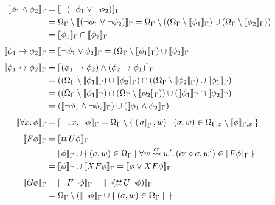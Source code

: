 \begin{align}
  \llbracket \phi_1 \land \phi_2 \rrbracket_{\Gamma}
    &= \llbracket \neg(\neg\phi_1 \lor \neg\phi_2) \rrbracket_{\Gamma} \notag \\
    &= \Omega_{\Gamma} \setminus \llbracket (\neg\phi_1 \lor \neg\phi_2) \rrbracket_{\Gamma} \notag
     = \Omega_{\Gamma} \setminus ((\Omega_{\Gamma} \setminus \llbracket \phi_1 \rrbracket_{\Gamma}) \cup (\Omega_{\Gamma}
         \setminus \llbracket \phi_2 \rrbracket_{\Gamma})) \notag \\
    &= \llbracket \phi_1 \rrbracket_{\Gamma} \cap \llbracket \phi_2 \rrbracket_{\Gamma} \label{eq:andsem} \\[1ex]
  \llbracket \phi_1 \to \phi_2 \rrbracket_{\Gamma}
    &= \llbracket \neg\phi_1 \lor \phi_2 \rrbracket_{\Gamma}
     = (\Omega_{\Gamma} \setminus \llbracket \phi_1 \rrbracket_{\Gamma}) \cup \llbracket \phi_2 \rrbracket_{\Gamma} \label{eq:impliessem} \\[1ex]
  \llbracket \phi_1 \leftrightarrow \phi_2 \rrbracket_{\Gamma}
    &= \llbracket (\phi_1 \to \phi_2) \land (\phi_2 \to \phi_1) \rrbracket_{\Gamma} \notag \\
    &= ((\Omega_{\Gamma} \setminus \llbracket \phi_1 \rrbracket_{\Gamma}) \cup \llbracket \phi_2 \rrbracket_{\Gamma}) \cap ((\Omega_{\Gamma}
         \setminus \llbracket \phi_2 \rrbracket_{\Gamma}) \cup \llbracket \phi_1 \rrbracket_{\Gamma}) \notag \\
    &= ((\Omega_{\Gamma} \setminus \llbracket \phi_1 \rrbracket_{\Gamma}) \cap (\Omega_{\Gamma} \setminus \llbracket \phi_2 \rrbracket_{\Gamma}))
         \cup (\llbracket \phi_1 \rrbracket_{\Gamma} \cap \llbracket \phi_2 \rrbracket_{\Gamma}) \notag \\
    &= (\llbracket \neg\phi_1 \land \neg\phi_2 \rrbracket_{\Gamma}) \cup (\llbracket \phi_1 \land \phi_2 \rrbracket_{\Gamma}) \label{eq:iffsem} \\[1ex]
  \llbracket \forall {x} \ldotp {\phi} \rrbracket_{\Gamma}
    &= \llbracket \neg\exists {x} \ldotp {\neg\phi} \rrbracket_{\Gamma}
     = \Omega_{\Gamma} \setminus \Set{(\left.{\sigma}\right|_{\Gamma}, w) | (\sigma, w) \in \Omega_{\Gamma,x}
         \setminus \llbracket \phi \rrbracket_{\Gamma,x}} \label{eq:forallsem} \\[1ex]
  \llbracket F\phi \rrbracket_{\Gamma}
    &= \llbracket {tt}\,U {\phi} \rrbracket_{\Gamma} \notag \\
    &= \llbracket \phi \rrbracket_{\Gamma} \cup \set{(\sigma, w) \in \Omega_{\Gamma} | \forall {w \overset{cr}{\rightsquigarrow} w'} \ldotp {(cr \circ
         \sigma, w') \in \llbracket F\phi \rrbracket_{\Gamma}}} \notag \\
    &= \llbracket \phi \rrbracket_{\Gamma} \cup \llbracket XF\phi \rrbracket_{\Gamma}
     = \llbracket \phi \lor XF\phi \rrbracket_{\Gamma} \label{eq:eventuallysem} \\[1ex]
  \llbracket G\phi \rrbracket_{\Gamma}
    &= \llbracket \neg F\neg\phi \rrbracket_{\Gamma}
     = \llbracket \neg({tt}\,U {\neg\phi}) \rrbracket_{\Gamma} \notag \\
    &= \Omega_{\Gamma} \setminus (\llbracket \neg\phi \rrbracket_{\Gamma} \cup \set{(\sigma, w) \in \Omega_{\Gamma} |
}
\end{align}
